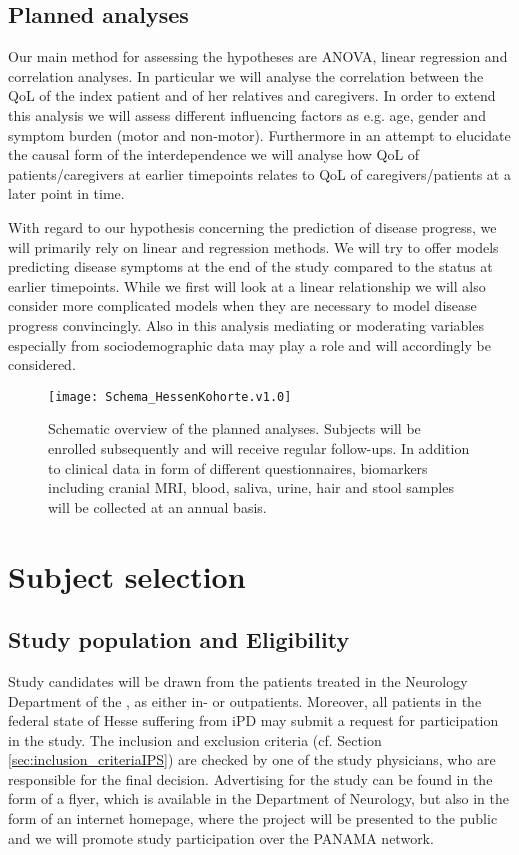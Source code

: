 \subsection{Planned analyses}
Our main method for assessing the hypotheses are \ac{ANOVA}, linear regression and correlation analyses. In particular we will analyse the correlation between the \ac{QoL} of the index patient and of her relatives and caregivers. In order to extend this analysis we will assess different influencing factors as e.g. age, gender and symptom burden (motor and non-motor). Furthermore in an attempt to elucidate the causal form of the interdependence we will analyse how \ac{QoL} of patients/caregivers at earlier timepoints relates to \ac{QoL} of caregivers/patients at a later point in time.

With regard to our hypothesis concerning the prediction of disease progress, we will primarily rely on linear and regression methods. We will try to offer models predicting disease symptoms at the end of the study compared to the status at earlier timepoints. While we first will look at a linear relationship we will also consider more complicated models when they are necessary to model disease progress convincingly. Also in this analysis mediating or moderating variables especially from sociodemographic data may play a role and will accordingly be considered.

\begin{figure}[h]
\label{fig2:scheme}
\centering
\texttt{[image: Schema\_HessenKohorte.v1.0]}
\caption{Schematic overview of the planned analyses. Subjects will be enrolled subsequently and will receive regular follow-ups. In addition to clinical data in form of different questionnaires, biomarkers including cranial \ac{MRI}, blood, saliva, urine, hair and stool samples will be collected at an annual basis.}
\end{figure}


\section{Subject selection}
\label{sec:study_selection}
\subsection{Study population and Eligibility}
\label{sec:study_population}
Study candidates will be drawn from the patients treated in the Neurology Department of the \UKM, as either in- or outpatients. Moreover, all patients in the federal state of Hesse suffering from \ac{iPD} may submit a request for participation in the study. The inclusion and exclusion criteria (cf. Section \ref{sec:inclusion_criteriaIPS}) are checked by one of the study physicians, who are responsible for the final decision. Advertising for the study can be found in the form of a flyer, which is available in the Department of Neurology, but also in the form of an internet homepage, where the project will be presented to the public and we will promote study participation over the \ac{PANAMA} network.

